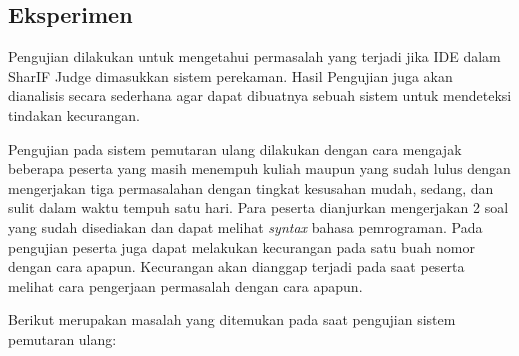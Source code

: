 \subsection{Eksperimen}

Pengujian dilakukan untuk mengetahui permasalah yang terjadi jika IDE dalam SharIF Judge dimasukkan sistem perekaman. Hasil Pengujian juga akan dianalisis secara sederhana agar dapat dibuatnya sebuah sistem untuk mendeteksi tindakan kecurangan.

Pengujian pada sistem pemutaran ulang dilakukan dengan cara mengajak beberapa peserta yang masih menempuh kuliah maupun yang sudah lulus dengan mengerjakan tiga permasalahan dengan tingkat kesusahan mudah, sedang, dan sulit dalam waktu tempuh satu hari. Para peserta dianjurkan mengerjakan 2 soal yang sudah disediakan dan dapat melihat \textit{syntax} bahasa pemrograman. Pada pengujian peserta juga dapat melakukan kecurangan pada satu buah nomor dengan cara apapun. Kecurangan akan dianggap terjadi pada saat peserta melihat cara pengerjaan permasalah dengan cara apapun.

Berikut merupakan masalah yang ditemukan pada saat pengujian sistem pemutaran ulang:

